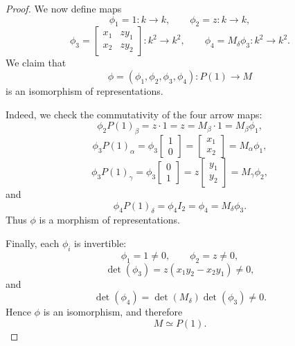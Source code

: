\documentclass[11pt, a4paper]{article}
\begin{document}
\begin{enumerate}[leftmargin=*, label=\textbf{\arabic*.}]
\begin{proof}
    We now define maps
    \[
    \phi_1=1\colon k\to k,\qquad
    \phi_2=z\colon k\to k,
    \]
    \[
    \phi_3=
    \begin{bmatrix}
    x_1 & zy_1\\
    x_2 & zy_2
    \end{bmatrix}\colon k^2\to k^2,
    \qquad
    \phi_4=M_\delta\phi_3\colon k^2\to k^2.
    \]
    We claim that
    \[
    \phi=(\phi_1,\phi_2,\phi_3,\phi_4)\colon P(1)\to M
    \]
    is an isomorphism of representations.
    
    Indeed, we check the commutativity of the four arrow maps:
    \[
    \phi_2 P(1)_\beta
    =
    z\cdot 1
    =
    z
    =
    M_\beta\cdot 1
    =
    M_\beta\phi_1,
    \]
    \[
    \phi_3 P(1)_\alpha
    =
    \phi_3\begin{bmatrix}1\\0\end{bmatrix}
    =
    \begin{bmatrix}x_1\\x_2\end{bmatrix}
    =
    M_\alpha\phi_1,
    \]
    \[
    \phi_3 P(1)_\gamma
    =
    \phi_3\begin{bmatrix}0\\1\end{bmatrix}
    =
    z\begin{bmatrix}y_1\\y_2\end{bmatrix}
    =
    M_\gamma\phi_2,
    \]
    and
    \[
    \phi_4 P(1)_\delta
    =
    \phi_4 I_2
    =
    \phi_4
    =
    M_\delta\phi_3.
    \]
    Thus \(\phi\) is a morphism of representations.
    
    Finally, each \(\phi_i\) is invertible:
    \[
    \phi_1=1\neq 0,\qquad \phi_2=z\neq 0,
    \]
    \[
    \det(\phi_3)=z(x_1y_2-x_2y_1)\neq 0,
    \]
    and
    \[
    \det(\phi_4)=\det(M_\delta)\det(\phi_3)\neq 0.
    \]
    Hence \(\phi\) is an isomorphism, and therefore
    \[
    M\simeq P(1).
    \]
    

\end{proof}
\end{enumerate}
\end{document}

